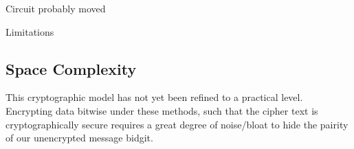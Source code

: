 \documentclass[a0,portrait]{a0poster}
\begin{document}
\begin{multicols}{2}
\begin{slide}{Circuit probably moved}
\begin{multicols}{3}
\end{multicols}
\end{slide}

\begin{slide}{Limitations}
\subsection*{Space Complexity}
  This cryptographic model has not yet been refined to a practical level. Encrypting data bitwise under these methods, such that the cipher text is cryptographically secure requires a great degree of noise/bloat to hide the pairity of our unencrypted message bidgit. 

  \vspace{1em}
  \vspace{1em}


\end{slide}
\end{multicols}
\end{document}
